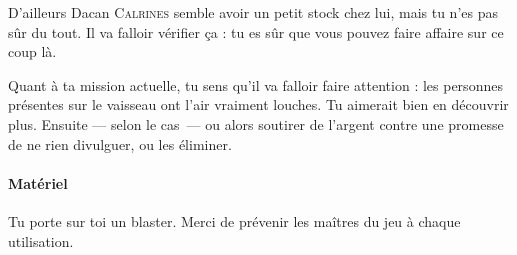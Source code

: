 \documentclass{article}
\begin{document}
{D’ailleurs Dacan \textsc{Calrines} semble avoir un petit stock chez lui, mais tu n’es pas sûr du tout.
Il va falloir vérifier ça : tu es sûr que vous pouvez faire affaire sur ce coup là.

Quant à ta mission actuelle, tu sens qu’il va falloir faire attention :
les personnes présentes sur le vaisseau ont l’air vraiment louches.
Tu aimerait bien en découvrir plus.
Ensuite — selon le cas — ou alors soutirer de l’argent contre une promesse de ne rien divulguer, ou les éliminer.

\paragraph{Matériel}
{
Tu porte sur toi un blaster.
Merci de prévenir les maîtres du jeu à chaque utilisation.
}
}
\end{document}
